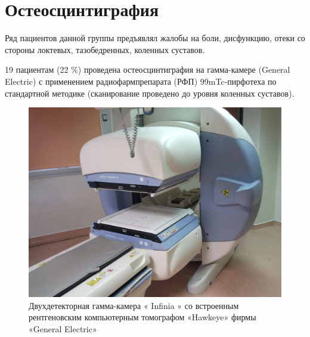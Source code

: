 \documentclass[11pt]{article}
\begin{document}
	
	
	\section{ Остеосцинтиграфия}
	Ряд пациентов данной группы предъявлял	жалобы на боли, дисфункцию, отеки со стороны 
	локтевых, тазобедренных, коленных суставов. 
	
	19 пациентам (22 \%) проведена остеосцинтиграфия на гамма-камере (General Electric) с 
	применением радиофармпрепарата (РФП) 99mTc-пирфотеха по стандартной методике 
	(сканирование проведено до уровня коленных 	суставов).  
	
	\begin{figure}[H]
		\centering
		\includegraphics[width=\textwidth]{gk}
		\caption{ Двухдетекторная гамма-камера « Infinia » со встроенным рентгеновским компьютерным томографом «Hawkeye» фирмы «General Electric» }
		\label{fig:gk}
	\end{figure} 
\end{document}
